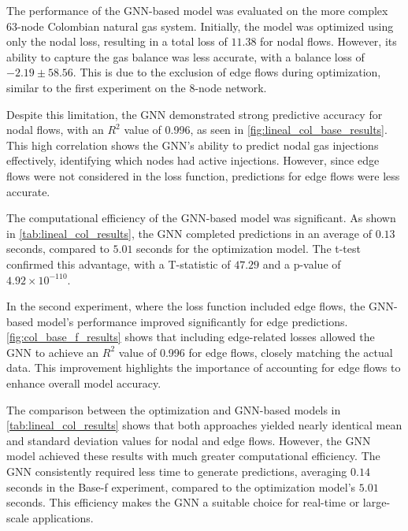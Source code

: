 The performance of the GNN-based model was evaluated on the more complex 63-node Colombian natural gas system. Initially, the model was optimized using only the nodal loss, resulting in a total loss of $11.38$ for nodal flows. However, its ability to capture the gas balance was less accurate, with a balance loss of $-2.19 \pm 58.56$. This is due to the exclusion of edge flows during optimization, similar to the first experiment on the 8-node network.

Despite this limitation, the GNN demonstrated strong predictive accuracy for nodal flows, with an $R^2$ value of 0.996, as seen in \cref{fig:lineal_col_base_results}. This high correlation shows the GNN's ability to predict nodal gas injections effectively, identifying which nodes had active injections. However, since edge flows were not considered in the loss function, predictions for edge flows were less accurate.

The computational efficiency of the GNN-based model was significant. As shown in \cref{tab:lineal_col_results}, the GNN completed predictions in an average of $0.13$ seconds, compared to $5.01$ seconds for the optimization model. The t-test confirmed this advantage, with a T-statistic of $47.29$ and a p-value of $4.92 \times 10^{-110}$.

In the second experiment, where the loss function included edge flows, the GNN-based model's performance improved significantly for edge predictions. \cref{fig:col_base_f_results} shows that including edge-related losses allowed the GNN to achieve an $R^2$ value of 0.996 for edge flows, closely matching the actual data. This improvement highlights the importance of accounting for edge flows to enhance overall model accuracy.

The comparison between the optimization and GNN-based models in \cref{tab:lineal_col_results} shows that both approaches yielded nearly identical mean and standard deviation values for nodal and edge flows. However, the GNN model achieved these results with much greater computational efficiency. The GNN consistently required less time to generate predictions, averaging $0.14$ seconds in the Base-f experiment, compared to the optimization model's $5.01$ seconds. This efficiency makes the GNN a suitable choice for real-time or large-scale applications.

